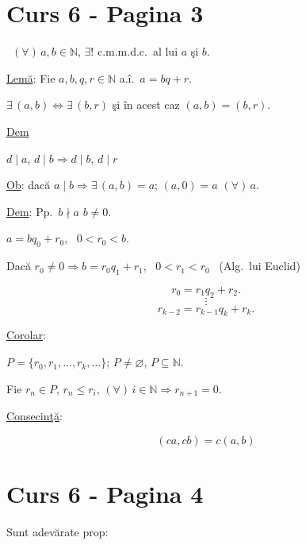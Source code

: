 \section*{Curs 6 - Pagina 3}

\noindent{} \ $(\forall)\,a,b\in\mathbb{N}$, $\exists!$ c.m.m.d.c.\ al lui $a$ şi $b$.

\bigskip
\noindent\underline{Lemă}: Fie $a,b,q,r\in\mathbb{N}$ a.î.\ $a=bq+r$.

\noindent $\exists\,(a,b) \Leftrightarrow \exists\,(b,r)$ şi în acest caz $(a,b)=(b,r)$.

\bigskip
\noindent\underline{Dem}

\noindent $d\mid a$, $d\mid b \Rightarrow d\mid b$, $d\mid r$

\bigskip
\noindent\underline{Ob}: dacă $a\mid b \Rightarrow \exists\,(a,b)=a$; $(a,0)=a$ $(\forall)\,a$.

\bigskip
\noindent\underline{Dem}: Pp.\ $b\nmid a$ \quad $b\neq 0$.

\noindent $a=bq_0+r_0$, \ $0<r_0<b$.

\noindent Dacă $r_0\neq 0 \Rightarrow b=r_0q_1+r_1$, \ $0<r_1<r_0$ \ (Alg.\ lui Euclid)

\[
r_0=r_1q_2+r_2.
\]
\[
\vdots
\]
\[
r_{k-2}=r_{k-1}q_k+r_k.
\]

\bigskip
\noindent\underline{Corolar}:

\noindent $P=\{r_0,r_1,\ldots,r_k,\ldots\}$; $P\neq\varnothing$, $P\subseteq\mathbb{N}$.

\noindent Fie $r_n\in P$, $r_n\leq r_i$, $(\forall)\,i\in\mathbb{N} \Rightarrow r_{n+1}=0$.

\bigskip
\noindent\underline{Consecinţă}:

\[
(ca,cb)=c(a,b)
\]





\section*{Curs 6 - Pagina 4}

\noindent Sunt adevărate prop:

